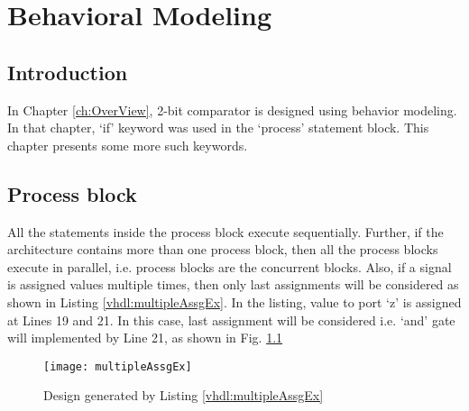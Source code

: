 \chapter{Behavioral Modeling} \label{ch:behavioralModeling}

\graphicspath{{Chapters/BehavioralModeling/Figures/}}


%

\section{Introduction}
In Chapter \ref{ch:OverView}, 2-bit comparator is designed using behavior modeling. In that chapter, `if' keyword was used in the `process' statement block. This chapter presents some more such keywords. 

\section{Process block}
All the statements inside the process block execute sequentially. Further, if the architecture contains more than one process block, then all the process blocks execute in parallel, i.e. process blocks are the concurrent blocks. Also, if a signal is assigned values multiple times, then only last assignments will be considered as shown in Listing \ref{vhdl:multipleAssgEx}. In the listing, value to port `z' is assigned at Lines 19 and 21. In this case, last assignment will be considered i.e. `and' gate will implemented by Line 21, as shown in Fig. \ref{fig:multipleAssgEx}



\begin{figure}
	\centering
	\texttt{[image: multipleAssgEx]}
	\caption{Design generated by Listing \ref{vhdl:multipleAssgEx}}
	\label{fig:multipleAssgEx}
\end{figure}

